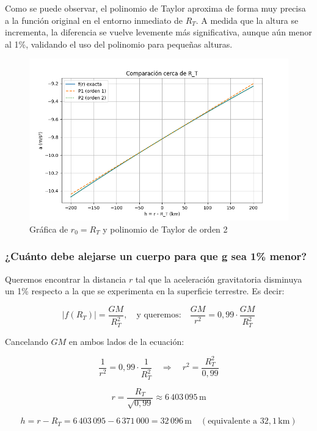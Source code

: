 \documentclass{article}
\begin{document}
Como se puede observar, el polinomio de Taylor aproxima de forma muy precisa a la función original en el entorno inmediato de $R_T$. A medida que la altura se incrementa, la diferencia se vuelve levemente más significativa, aunque aún menor al 1\%, validando el uso del polinomio para pequeñas alturas.

\begin{figure}[H]
    \centering
    \includegraphics[width=1\textwidth]{assets/taylor_vs_gravedad.png}
    \caption{Gráfica de $r_0 = R_T$ y polinomio de Taylor de orden 2}
\end{figure}

\subsubsection{¿Cuánto debe alejarse un cuerpo para que g sea 1\% menor?}

Queremos encontrar la distancia $r$ tal que la aceleración gravitatoria disminuya un 1\% respecto a la que se experimenta en la superficie terrestre. Es decir:

\[
|f(R_T)| = \frac{GM}{R_T^2}, \quad \text{y queremos:} \quad \frac{GM}{r^2} = 0{,}99 \cdot \frac{GM}{R_T^2}
\]

Cancelando $GM$ en ambos lados de la ecuación:

\[
\frac{1}{r^2} = 0{,}99 \cdot \frac{1}{R_T^2} \quad \Rightarrow \quad r^2 = \frac{R_T^2}{0{,}99}
\]

\[
r = \frac{R_T}{\sqrt{0{,}99}} \approx 6\,403\,095\,\text{m}
\]

\[
h = r - R_T = 6\,403\,095 - 6\,371\,000 = 32\,096\,\text{m} \quad (\text{equivalente a } 32{,}1\,\text{km})
\]

\vspace{0.5em}
\end{document}
